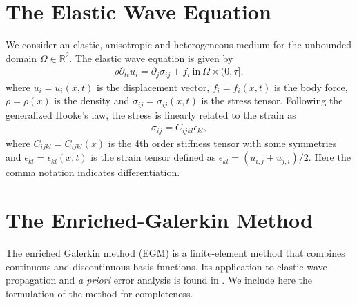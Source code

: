 \documentclass[review,hidelinks,onefignum,onetabnum]{siamart220329}
\newcommand{\mitbf}[1]{\boldsymbol{\mathit{#1}}}
\begin{document}
\section{The Elastic Wave Equation}
We consider an elastic, anisotropic and heterogeneous medium for the unbounded domain $\Omega\in\mathbb{R}^2$. The elastic wave equation is given by
%
\begin{eqnarray}\label{eq:elast_wv_eq}
\rho\partial_{tt}u_i=\partial_j\sigma_{ij}+f_i\ \mathrm{in}\ \Omega\times(0,\tau],
\end{eqnarray}
%
where $u_i=u_i(\mitbf x,t)$ is the displacement vector, $f_i=f_i(\mitbf x,t)$ is the body force, $\rho=\rho(\mitbf x)$ is the density and $\sigma_{ij}=\sigma_{ij}(\mitbf x,t)$ is the stress tensor. Following the generalized Hooke's law, the stress is linearly related to the strain as
%
\begin{eqnarray}\label{eq:stress_strain}
\sigma_{ij}=C_{ijkl}\epsilon_{kl},
\end{eqnarray}
%
where $C_{ijkl}=C_{ijkl}(\mitbf x)$ is the 4th order stiffness tensor with some symmetries and $\epsilon_{kl}=\epsilon_{kl}(\mitbf x,t)$ is the strain tensor defined as $\epsilon_{kl}=\left(u_{i,j}+u_{j,i}\right)/2$. Here the comma notation indicates differentiation.

\section{The Enriched-Galerkin Method}

The enriched Galerkin method (EGM) is a finite-element method that combines continuous and discontinuous basis functions. Its application to elastic wave propagation and \textit{a priori} error analysis is found in \cite{Vamaraju2018}. We include here the formulation of the method for completeness.
\end{document}
